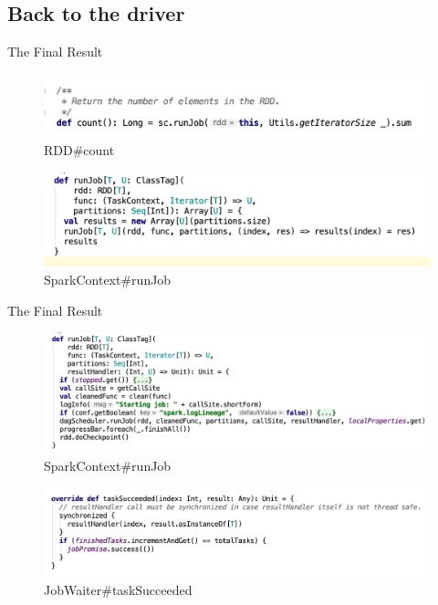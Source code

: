 \subsection{Back  to the driver}
\begin{frame}[plain,t]{The Final Result} %
	 \\ 
	\begin{figure}
		\centering
		\includegraphics[width=0.9\linewidth]{images/rdd006}
		\caption{RDD\#count}
		\label{fig:rdd006}
	\end{figure}
	\begin{figure}
		\centering
		\includegraphics[width=0.9\linewidth]{images/rdd007}
		\caption{SparkContext\#runJob}
		\label{fig:rdd007}
	\end{figure}
	
\end{frame}
\begin{frame}[plain,t]{The Final Result} %
	 \\ 

\begin{figure}
	\centering
	\includegraphics[width=0.9\linewidth]{images/rdd010}
	\caption{SparkContext\#runJob}
	\label{fig:rdd010}
\end{figure}
	\begin{figure}
	\centering
	\includegraphics[width=0.9\linewidth]{images/rdd008}
	\caption{JobWaiter\#taskSucceeded}
	\label{fig:rdd008}
\end{figure}
	
\end{frame}
